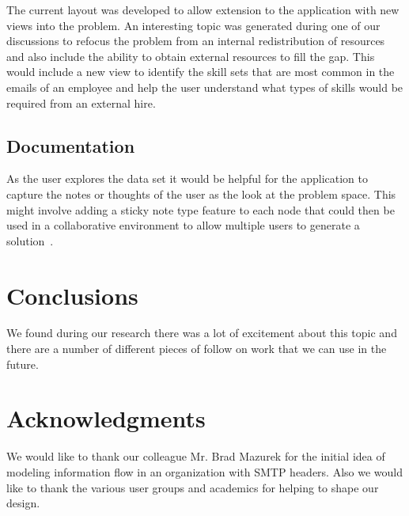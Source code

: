 \documentclass[journal]{vgtc}                %
\begin{document}
The current layout was developed to allow extension to the application with new views into the problem.  An interesting topic was generated during one of our discussions to refocus the problem from an internal redistribution of resources and also include the ability to obtain external resources to fill the gap.  This would include a new view to identify the skill sets that are most common in the emails of an employee and help the user understand what types of skills would be required from an external hire.

\subsection{Documentation}

As the user explores the data set it would be helpful for the application to capture the notes or thoughts of the user as the look at the problem space.  This might involve adding a sticky note type feature to each node that could then be used in a collaborative environment to allow multiple users to generate a solution~\cite{ware2012information}.

\section{Conclusions}
\label{sec:conclusions}

We found during our research there was a lot of excitement about this topic and there are a number of different pieces of follow on work that we can use in the future.

\section{Acknowledgments}
We would like to thank our colleague Mr. Brad Mazurek for the initial idea of modeling information flow in an organization with SMTP headers. Also we would like to thank the various user groups and academics for helping to shape our design.



\end{document}
